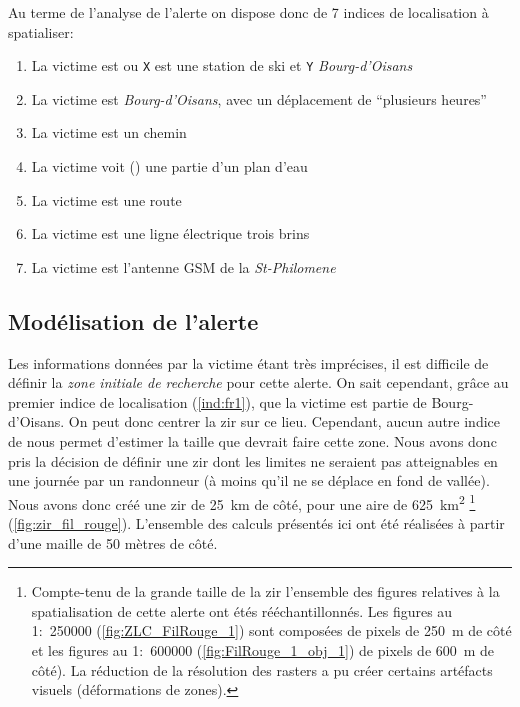 Au terme de l'analyse de l'alerte on dispose donc de 7 indices de
localisation à spatialiser:
% 
\begin{enumerate}
\item \label{ind:fr1} La victime est
   ou \texttt{X} est
  une station de ski et \texttt{Y} \emph{Bourg-d'Oisans}
\item \label{ind:fr2} La victime est
   \emph{Bourg-d'Oisans}, avec un
  déplacement de \enquote{plusieurs heures}
\item \label{ind:fr3} La victime est  un
  chemin
\item \label{ind:fr4} La victime voit ()
  une partie d'un plan d'eau
\item \label{ind:fr5} La victime est  une
  route
\item \label{ind:fr6} La victime est  une
  ligne électrique trois brins
\item \label{ind:fr7} La victime est 
  l'antenne GSM de la \emph{St-Philomene}
\end{enumerate}

\subsection{Modélisation de l'alerte}
\label{subsec:9-4-2}

Les informations données par la victime étant très imprécises, il est
difficile de définir la \emph{zone initiale de recherche} pour cette
alerte. On sait cependant, grâce au premier indice de localisation
(\ref{ind:fr1}), que la victime est partie de Bourg-d'Oisans. On peut
donc centrer la \ac{zir} sur ce lieu. Cependant, aucun autre indice de
nous permet d'estimer la taille que devrait faire cette zone. Nous
avons donc pris la décision de définir une \ac{zir} dont les limites
ne seraient pas atteignables en une journée par un randonneur (à moins
qu'il ne se déplace en fond de vallée).
%
Nous avons donc créé une \ac{zir} de \SI{25}{\kilo\meter} de côté,
pour une aire de \SI{625}{\kilo\meter\squared} \footnote{Compte-tenu
  de la grande taille de la \ac{zir} l'ensemble des figures relatives
  à la spatialisation de cette alerte ont étés rééchantillonnés. Les
  figures au 1:~\num{250000} (\eg \autoref{fig:ZLC_FilRouge_1}) sont
  composées de pixels de \SI{250}{\meter} de côté et les figures au
  1:~\num{600000} (\eg \autoref{fig:FilRouge_1_obj_1}) de pixels de
  \SI{600}{\meter} de côté). La réduction de la résolution des rasters
  a pu créer certains artéfacts visuels (\eg déformations de zones).}
(\autoref{fig:zir_fil_rouge}). L'ensemble des calculs présentés ici
ont été réalisées à partir d'une maille de 50 mètres de côté.


